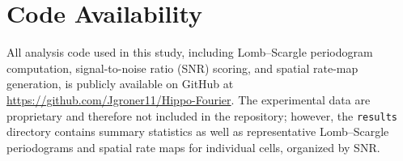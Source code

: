 \documentclass[preprint]{aastex701}
\begin{document}
\section{Code Availability}
All analysis code used in this study, including Lomb--Scargle periodogram computation, signal-to-noise ratio (SNR) scoring, and spatial rate-map generation, is publicly available on GitHub at \url{https://github.com/Jgroner11/Hippo-Fourier}. The experimental data are proprietary and therefore not included in the repository; however, the \texttt{results} directory contains summary statistics as well as representative Lomb--Scargle periodograms and spatial rate maps for individual cells, organized by SNR.



\end{document}
